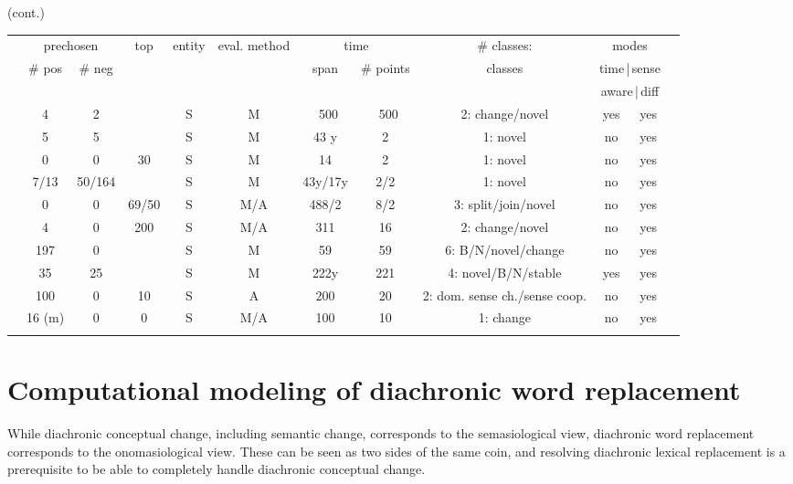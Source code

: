 \documentclass[output=paper]{langsci/langscibook}
\begin{document}
\begin{table}
\footnotesize
{} (cont.)\\
\begin{tabular}{@{}>{\raggedright}p{}@{}c@{}cc@{}cc@{}cc@{}cccc@{}}
\midrule
&\multicolumn{2}{c}{prechosen} & top & entity &eval. method & \multicolumn{2}{c}{time} & \# classes: &  
\multicolumn{2}{c}{modes}\\
& \# pos & \# neg & &   &  & span & \# points & classes & \multicolumn{2}{c}{{time\,|\,sense}}\\
&  &  & &   &  &  &  & & \multicolumn{2}{c}{{aware\,|\,diff}}\\
\midrule
{\citet{wijaya2011understanding}} & 4 & 2 & & S & M & ~500 & ~500 &  
2: change/novel & yes & yes\\
{\citet{lau-etal-2012-word}} & 5 & 5 & & S & M & 43 y & 2 &   
1: novel &no&yes\\
%
{\citet{cook13alexicographic}} & 0 & 0& 30 & S & M & 14 & 2 &  
1: novel & no & yes\\
%
{\citet{cook-etal-2014-novel}} & 7/13 & 50/164 & & S & M & 43y/17y & 2/2 &  
1: novel & no&yes\\
%
{\citet{mitra2015automatic}} & 0 & 0 & 69/50& S & M/A & 488/2 & 8/2&  
3: split/join/novel& no&yes\\
%
{\citet{frermann-lapata-2016-bayesian}} & 4 & 0 & 200 & S & M/A & 311 & 16 & 
2: change/novel & no & yes\\ 
%
{\citet{tang2016}}& 197 & 0 &  & S & M&  59 & 59 &   
6: B/N/novel/change & no & yes\\
%
%
{\citet{tahmasebi-ranlp17}} & 35& 25 & & S & M& 222y & 221 &  
4: novel/B/N/stable & yes&yes\\ 
{\citet{hu-etal-2019-diachronic}}& 100& 0 & 10 & S & A & 200 & 20&  
2: dom. sense ch./sense coop. & no & yes\\
{\citet{giulianelli-etal-2020-analysing}} & 16 (m) & 0 & 0 & S& M/A& 100 & 10 & 
1: change & no & yes \\
\lspbottomrule
\end{tabular}
\end{table}


\section{Computational modeling of diachronic word replacement}\label{sec:dwr}

While diachronic conceptual change, including semantic change, corresponds to the semasiological view, diachronic word replacement corresponds to the onomasiological view. These can be seen as two sides of the same coin, and resolving diachronic lexical replacement is a prerequisite to be able to completely handle diachronic conceptual change.
 
\end{document}
